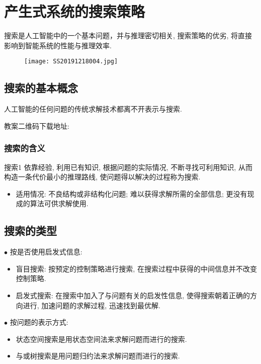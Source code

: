 \chapter{产生式系统的搜索策略}\label{AIchap4}
\begin{tcolorbox}[colback=white!50,colframe=orange!50,title=搜索]
    搜索是人工智能中的一个基本问题，并与推理密切相关, 搜索策略的优劣, 将直接影响到智能系统的性能与推理效率.\hfill
\end{tcolorbox}
\begin{figure}[H]
    \centering
    \texttt{[image: SS20191218004.jpg]}
    \label{SS20191218004}
\end{figure}
\section{搜索的基本概念}
    人工智能的任何问题的传统求解技术都离不开表示与搜索.
    
    教案二维码下载地址: 
\subsection{搜索的含义}
\begin{mydef}{搜索}{1}
    依靠经验, 利用已有知识, 根据问题的实际情况, 不断寻找可利用知识, 从而构造一条代价最小的推理路线, 使问题得以解决的过程称为搜索.
\end{mydef}

\begin{itemize}
\item 适用情况: 不良结构或非结构化问题; 难以获得求解所需的全部信息; 更没有现成的算法可供求解使用.
\end{itemize}
\section{搜索的类型}

$\bullet$ 按是否使用启发式信息:
    \begin{itemize}
        \item 盲目搜索: 按预定的控制策略进行搜索, 在搜索过程中获得的中间信息并不改变控制策略.
        \item 启发式搜索: 在搜索中加入了与问题有关的启发性信息, 使得搜索朝着正确的方向进行, 加速问题的求解过程, 迅速找到最优解.
    \end{itemize}
$\bullet$ 按问题的表示方式:
    \begin{itemize}
        \item 状态空间搜索是用状态空间法来求解问题而进行的搜索.
        \item 与或树搜索是用问题归约法来求解问题而进行的搜索.
    \end{itemize}
